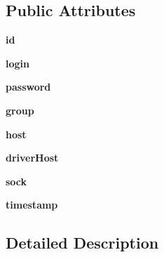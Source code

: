 \subsection*{Public Attributes}
\begin{CompactItemize}
\item 
\hypertarget{class_serv_1_1_user_1_1_user_9ccda7549874ecd0e505e47ab9f7e2f7}{
\textbf{id}}
\label{class_serv_1_1_user_1_1_user_9ccda7549874ecd0e505e47ab9f7e2f7}

\item 
\hypertarget{class_serv_1_1_user_1_1_user_26c268efd71044c8d201de3f2cc75ae1}{
\textbf{login}}
\label{class_serv_1_1_user_1_1_user_26c268efd71044c8d201de3f2cc75ae1}

\item 
\hypertarget{class_serv_1_1_user_1_1_user_ee1a7e306077b5c7b94746c088fd6807}{
\textbf{password}}
\label{class_serv_1_1_user_1_1_user_ee1a7e306077b5c7b94746c088fd6807}

\item 
\hypertarget{class_serv_1_1_user_1_1_user_244ae8ec25ad4fd34379c275a3f71267}{
\textbf{group}}
\label{class_serv_1_1_user_1_1_user_244ae8ec25ad4fd34379c275a3f71267}

\item 
\hypertarget{class_serv_1_1_user_1_1_user_b8dc612b892abb8d84cd2149cc3c5f3c}{
\textbf{host}}
\label{class_serv_1_1_user_1_1_user_b8dc612b892abb8d84cd2149cc3c5f3c}

\item 
\hypertarget{class_serv_1_1_user_1_1_user_7beeb2284a00949cec3e6012ec84b07b}{
\textbf{driverHost}}
\label{class_serv_1_1_user_1_1_user_7beeb2284a00949cec3e6012ec84b07b}

\item 
\hypertarget{class_serv_1_1_user_1_1_user_1b29d91b1e55fb1089921d3dbceaf5db}{
\textbf{sock}}
\label{class_serv_1_1_user_1_1_user_1b29d91b1e55fb1089921d3dbceaf5db}

\item 
\hypertarget{class_serv_1_1_user_1_1_user_4361ad465bc018dd14f11d50bf0adad5}{
\textbf{timestamp}}
\label{class_serv_1_1_user_1_1_user_4361ad465bc018dd14f11d50bf0adad5}

\end{CompactItemize}


\subsection{Detailed Description}


